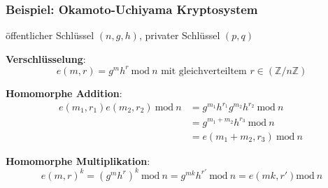 \documentclass[handout,usenames,dvipsnames]{beamer}
\begin{document}
\begin{frame}
	\frametitle{Beispiel: Okamoto-Uchiyama Kryptosystem}
    öffentlicher Schlüssel $(n,g,h)$, privater Schlüssel $(p,q)$ \newline
    
    \textbf{Verschlüsselung}:
    \begin{equation*}    e(m,r)=g^m h^r\ \text{mod}\ n \text{  mit gleichverteiltem  } r\in(\mathbb{Z}/ n\mathbb{Z}) \end{equation*}
    
    \textbf{Homomorphe Addition}:
    \begin{align*}
    e(m_1,r_1) e(m_2,r_2)\ \text{mod}\ n &= g^{m_1} h^{r_1}g^{m_2} h^{r_2} \ \text{mod}\ n  \\ & =  g^{m_1+m_2} h^{r_3}\ \text{mod}\ n \\ &= e(m_1+m_2,r_3) \ \text{mod}\ n\  
    \end{align*}
    
    \textbf{Homomorphe Multiplikation}:
    \begin{equation*}
    e(m, r)^k = (g^{m} h^{r})^k \ \text{mod}\ n = g^{m k} h^{r'}\ \text{mod}\ n = e(m k, r') \text{mod}\ n
    \end{equation*}
   
	
\end{frame}
\end{document}
